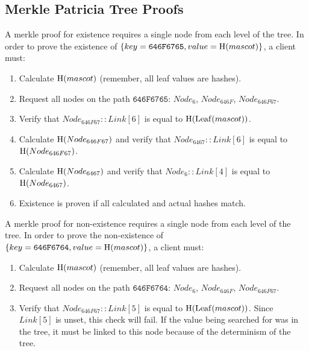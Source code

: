 \subsection{Merkle Patricia Tree Proofs}

A merkle proof for existence requires a single node from each level of the tree.
In order to prove the existence of $\{key = \texttt{646F6765}, value = \operatorname{H}(mascot)\}$, a client must:
\begin{enumerate}
	\item{Calculate $\operatorname{H}(mascot)$ (remember, all leaf values are hashes).}
	\item{Request all nodes on the path $\texttt{646F6765}$: $Node_{6}$, $Node_{646F}$, $Node_{646F67}$.}
	\item{Verify that $Node_{646F67}::Link[6]$ is equal to $\operatorname{H}(\operatorname{Leaf}(mascot))$.}
	\item{Calculate $\operatorname{H}(Node_{646F67})$ and verify that $Node_{6467}::Link[6]$ is equal to $\operatorname{H}(Node_{646F67})$.}
	\item{Calculate $\operatorname{H}(Node_{6467})$ and verify that $Node_{6}::Link[4]$ is equal to $\operatorname{H}(Node_{6467})$.}
	\item{Existence is proven if all calculated and actual hashes match.}
\end{enumerate}

A merkle proof for non-existence requires a single node from each level of the tree.
In order to prove the non-existence of $\{key = \texttt{646F6764}, value = \operatorname{H}(mascot)\}$, a client must:
\begin{enumerate}
	\item{Calculate $\operatorname{H}(mascot)$ (remember, all leaf values are hashes).}
	\item{Request all nodes on the path $\texttt{646F6764}$: $Node_{6}$, $Node_{646F}$, $Node_{646F67}$.}
	\item{
		Verify that $Node_{646F67}::Link[5]$ is equal to $\operatorname{H}(\operatorname{Leaf}(mascot))$.
		Since $Link[5]$ is unset, this check will fail.
		If the value being searched for was in the tree, it must be linked to this node because of the determinism of the tree.
	 }
\end{enumerate}
